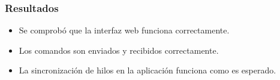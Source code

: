 \subsubsection{Resultados}

\begin{itemize}
\item Se comprobó que la interfaz web funciona correctamente.
\item Los comandos son enviados y recibidos correctamente.
\item La sincronización de hilos en la aplicación funciona como es esperado.
\end{itemize}
